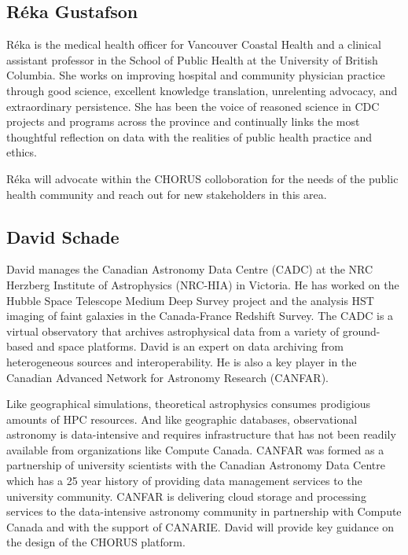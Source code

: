 \subsection*{R\'eka Gustafson}

R\'eka is the medical health officer for Vancouver Coastal Health and a
clinical assistant professor in the School of Public Health at the
University of British Columbia. She works on improving hospital and
community physician practice through good science, excellent knowledge
translation, unrelenting advocacy, and extraordinary persistence. She
has been the voice of reasoned science in CDC projects and programs
across the province and continually links the most thoughtful
reflection on data with the realities of public health practice and
ethics.

R\'eka will advocate within the CHORUS colloboration for the needs of
the public health community and reach out for new stakeholders in this
area.

\subsection*{David Schade}

David manages the Canadian Astronomy Data Centre (CADC) at the NRC
Herzberg Institute of Astrophysics (NRC-HIA) in Victoria. He has
worked on the Hubble Space Telescope Medium Deep Survey project and
the analysis HST imaging of faint galaxies in the Canada-France
Redshift Survey. The CADC is a virtual observatory that archives
astrophysical data from a variety of ground-based and space platforms.
David is an expert on data archiving from heterogeneous sources and
interoperability.  He is also a key player in the Canadian Advanced
Network for Astronomy Research (CANFAR).

Like geographical simulations, theoretical astrophysics consumes
prodigious amounts of HPC resources. And like geographic databases,
observational astronomy is data-intensive and requires infrastructure
that has not been readily available from organizations like Compute
Canada. CANFAR was formed as a partnership of university scientists
with the Canadian Astronomy Data Centre which has a 25 year history of
providing data management services to the university community. CANFAR
is delivering cloud storage and processing services to the
data-intensive astronomy community in partnership with Compute Canada
and with the support of CANARIE.  David will provide key guidance on the
design of the CHORUS platform.


